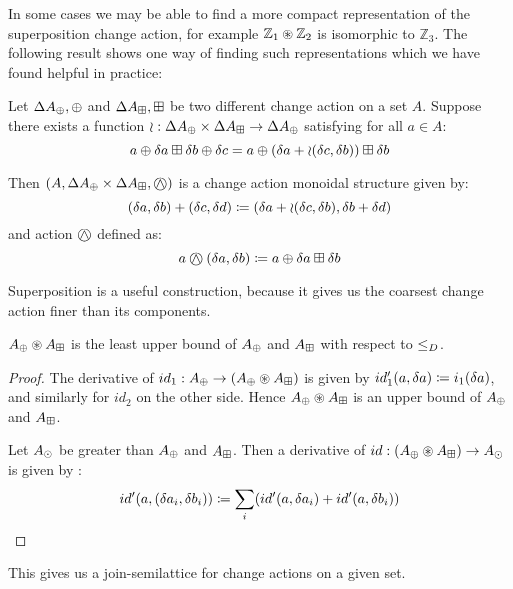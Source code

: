 In some cases we may be able to find a more compact representation of the
superposition change action, for example $\mathbb{Z}_1 \circledast \mathbb{Z}_2$ is 
isomorphic to $\mathbb{Z}_3$. The following result shows one way of finding such representations which
we have found helpful in practice:

\begin{prop}
  Let $\Delta A_\oplus, \oplus$ and $\Delta A_\boxplus, \boxplus$ be two different change action on
  a set $A$. Suppose there exists a function
  $\wr : \Delta A_\oplus \times \Delta A_\boxplus \rightarrow \Delta A_\oplus$ satisfying for
  all $a \in A$:
  $$
    a \oplus \delta a \boxplus \delta b \oplus \delta c
    = a \oplus (\delta a + \wr(\delta c,\delta b)) \boxplus \delta b
  $$

  Then $\cstruct{A}{\changes{A}_\cplus \times \changes{A}_\cpluss}{\cplussym{\wedge}}$
  is a change action monoidal structure given by:
  $$
    (\delta a, \delta b) + (\delta c, \delta d) \coloneqq 
    (\delta a + \wr(\delta c, \delta b), \delta b + \delta d)
  $$
  and action $\cplussym{\wedge}$ defined as:
  $$
    a \cplussym{\wedge} (\change{a}, \change{b}) \defeq a \cplus \change{a} \cpluss \change{b}
  $$
\end{prop}

Superposition is a useful construction, because it gives us the coarsest
change action finer than its components.

\begin{corollary}
  $A_\oplus \circledast A_\boxplus$ is the least upper bound of $A_\oplus$ and $A_\boxplus$ with respect to $\leq_D$.
\end{corollary}
\ifproofs
\begin{proof}
  The derivative of $id_1: A_\oplus \rightarrow (A_\oplus \circledast
  A_\boxplus)$ is given by $id_1'(a, \delta a) \coloneqq 
  i_1(\delta a)$, and similarly for $id_2$ on the other side. Hence $A_\oplus \circledast A_\boxplus$ 
  is an upper bound of $A_\oplus$ and $A_\boxplus$.

  Let $A_\odot$ be greater than $A_\oplus$ and $A_\boxplus$.
  Then a
  derivative of $id: (A_\oplus \circledast A_\boxplus) \rightarrow A_\odot$ is
  given by :
  $$
  id'(a, (\delta a_i, \delta b_i)) \coloneqq 
    \sum_i (id'(a, \delta a_i) + id'(a, \delta b_i))
  $$
\end{proof}
\fi

This gives us a join-semilattice for change actions on a given set.

